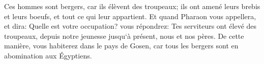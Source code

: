 \verse Ces hommes sont bergers, car ils élèvent des troupeaux; ils ont amené leurs brebis et leurs boeufs, et tout ce qui leur appartient. 
\verse Et quand Pharaon vous appellera, et dira: 
\verse Quelle est votre occupation? vous répondrez: Tes serviteurs ont élevé des troupeaux, depuis notre jeunesse jusqu`à présent, nous et nos pères. De cette manière, vous habiterez dans le pays de Gosen, car tous les bergers sont en abomination aux Égyptiens. 

\chapter{}

